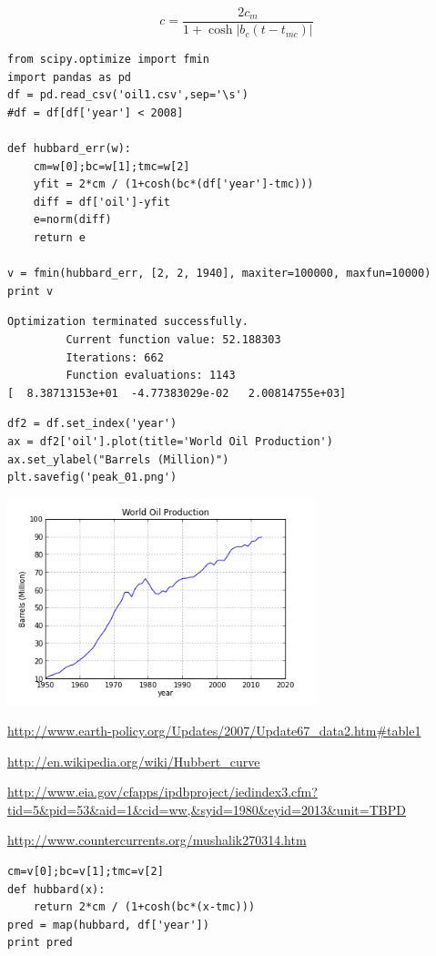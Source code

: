 \documentclass[12pt,fleqn]{article}\usepackage{../common}
\begin{document}
$$ 
c = \frac{ 2c_m}{1 + \cosh |b_c(t-t_{mc})|   }
$$


\begin{verbatim}
from scipy.optimize import fmin
import pandas as pd
df = pd.read_csv('oil1.csv',sep='\s')
#df = df[df['year'] < 2008]

def hubbard_err(w):
    cm=w[0];bc=w[1];tmc=w[2]
    yfit = 2*cm / (1+cosh(bc*(df['year']-tmc)))
    diff = df['oil']-yfit
    e=norm(diff)
    return e

v = fmin(hubbard_err, [2, 2, 1940], maxiter=100000, maxfun=10000)
print v
\end{verbatim}

\begin{verbatim}
Optimization terminated successfully.
         Current function value: 52.188303
         Iterations: 662
         Function evaluations: 1143
[  8.38713153e+01  -4.77383029e-02   2.00814755e+03]
\end{verbatim}

\begin{verbatim}
df2 = df.set_index('year')
ax = df2['oil'].plot(title='World Oil Production')
ax.set_ylabel("Barrels (Million)")
plt.savefig('peak_01.png')
\end{verbatim}


\includegraphics[height=6cm]{peak_01.png}

\url{http://www.earth-policy.org/Updates/2007/Update67_data2.htm#table1}

\url{http://en.wikipedia.org/wiki/Hubbert_curve}

\url{http://www.eia.gov/cfapps/ipdbproject/iedindex3.cfm?tid=5&pid=53&aid=1&cid=ww,&syid=1980&eyid=2013&unit=TBPD}

\url{http://www.countercurrents.org/mushalik270314.htm}


\begin{verbatim}
cm=v[0];bc=v[1];tmc=v[2]
def hubbard(x): 
    return 2*cm / (1+cosh(bc*(x-tmc)))
pred = map(hubbard, df['year'])
print pred
\end{verbatim}
\end{document}
